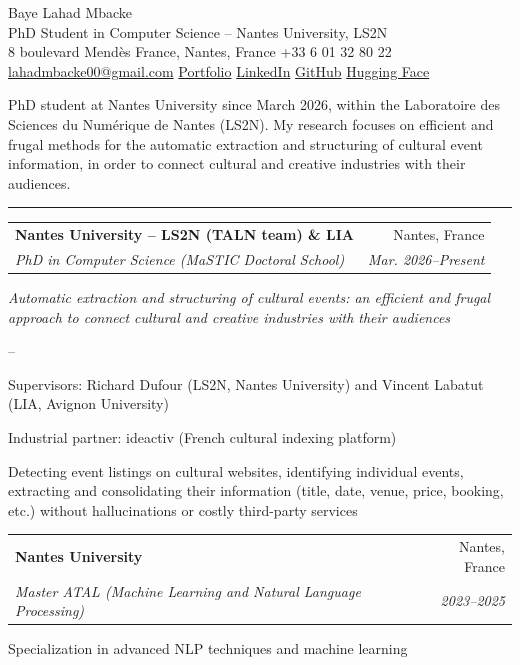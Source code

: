 \documentclass[11pt,a4paper]{article}
\makeatletter
\newcommand{\cvsection}[1]{%
  \vspace{10pt}{\Large\color{accent}#1}\par\vspace{-6pt}%
  {\color{accent}\rule{\linewidth}{0.8pt}}\par\vspace{4pt}}
\newcommand{\cventry}[4]{%
  \begin{tabularx}{\linewidth}{@{}X r@{}}
    \textbf{#1} & #2 \\
    \textit{#3} & \textit{#4}
  \end{tabularx}\par}
\newenvironment{cvitems}{%
  \begin{list}{--}{\setlength{\leftmargin}{1.5em}\setlength{\itemsep}{1pt}
  \setlength{\parsep}{0pt}\setlength{\topsep}{2pt}}}{\end{list}\vspace{4pt}}
\makeatother
\begin{document}
\begin{center}
  {\fontsize{24}{28}\selectfont\color{accent} Baye Lahad Mbacke}\\[6pt]
  PhD Student in Computer Science -- Nantes University, LS2N\\[2pt]
  8 boulevard Mendès France, Nantes, France \textbullet{} +33 6 01 32 80 22\\[2pt]
  \href{mailto:lahadmbacke00@gmail.com}{lahadmbacke00@gmail.com} \textbullet{}
  \href{https://lahadmbacke.github.io/Lahad_Mbacke/}{Portfolio} \textbullet{}
  \href{https://linkedin.com/in/baye-lahad-mbacke}{LinkedIn} \textbullet{}
  \href{https://github.com/LahadMbacke}{GitHub} \textbullet{}
  \href{https://huggingface.co/Lahad}{Hugging Face}
\end{center}

\vspace{4pt}
PhD student at Nantes University since March 2026, within the Laboratoire des Sciences du
Numérique de Nantes (LS2N). My research focuses on efficient and frugal methods for the automatic
extraction and structuring of cultural event information, in order to connect cultural and
creative industries with their audiences.

\cvsection{Education}

\cventry{Nantes University -- LS2N (TALN team) \& LIA}{Nantes, France}
        {PhD in Computer Science (MaSTIC Doctoral School)}{Mar. 2026--Present}
\textit{Automatic extraction and structuring of cultural events: an efficient and frugal approach
to connect cultural and creative industries with their audiences}
\begin{cvitems}
  \item Supervisors: Richard Dufour (LS2N, Nantes University) and Vincent Labatut (LIA, Avignon University)
  \item Industrial partner: ideactiv (French cultural indexing platform)
  \item Detecting event listings on cultural websites, identifying individual events, extracting
        and consolidating their information (title, date, venue, price, booking, etc.) without
        hallucinations or costly third-party services
\end{cvitems}

\cventry{Nantes University}{Nantes, France}
        {Master ATAL (Machine Learning and Natural Language Processing)}{2023--2025}
Specialization in advanced NLP techniques and machine learning\par\vspace{6pt}
\end{document}
